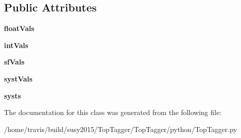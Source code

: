 \subsection*{Public Attributes}
\begin{DoxyCompactItemize}
\item 
\hypertarget{classTopTagger_1_1TopTaggerResult_a3e180987b6abcfe7cc7c40b199f0c386}{{\bfseries float\-Vals}}\label{classTopTagger_1_1TopTaggerResult_a3e180987b6abcfe7cc7c40b199f0c386}

\item 
\hypertarget{classTopTagger_1_1TopTaggerResult_a6cf9e0d32998c8ac16efaaa4ae32c2ad}{{\bfseries int\-Vals}}\label{classTopTagger_1_1TopTaggerResult_a6cf9e0d32998c8ac16efaaa4ae32c2ad}

\item 
\hypertarget{classTopTagger_1_1TopTaggerResult_a46e53d5ef65067c797f8d11644d9100a}{{\bfseries sf\-Vals}}\label{classTopTagger_1_1TopTaggerResult_a46e53d5ef65067c797f8d11644d9100a}

\item 
\hypertarget{classTopTagger_1_1TopTaggerResult_a689adeafa68d3a7e63a9f8f271786ef4}{{\bfseries syst\-Vals}}\label{classTopTagger_1_1TopTaggerResult_a689adeafa68d3a7e63a9f8f271786ef4}

\item 
\hypertarget{classTopTagger_1_1TopTaggerResult_a9d0002e4c4b62a20b196d0fcc8fd3b79}{{\bfseries systs}}\label{classTopTagger_1_1TopTaggerResult_a9d0002e4c4b62a20b196d0fcc8fd3b79}

\end{DoxyCompactItemize}


The documentation for this class was generated from the following file\-:\begin{DoxyCompactItemize}
\item 
/home/travis/build/susy2015/\-Top\-Tagger/\-Top\-Tagger/python/Top\-Tagger.\-py\end{DoxyCompactItemize}
